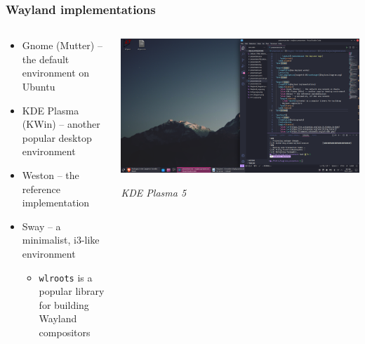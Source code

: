 \documentclass{beamer}
\begin{document}
\begin{frame}
  \frametitle{Wayland implementations}
  \begin{columns}[T]
    \begin{column}{0.7\textwidth}
  \begin{itemize}
    \item Gnome (Mutter) -- the default environment on Ubuntu
    \item KDE Plasma (KWin) -- another popular desktop environment
    \item Weston -- the reference implementation
    \item Sway -- a minimalist, i3-like environment
    \begin{itemize}
      \item \texttt{wlroots} is a popular library for building Wayland compositors
    \end{itemize}
  \end{itemize}
    \end{column}
    \begin{column}{0.3\textwidth}
      \includegraphics[width=\textwidth]{KDE_Wayland.png}

      \textit{\footnotesize KDE Plasma 5}
    \end{column}
  \end{columns}
\end{frame}
\end{document}
